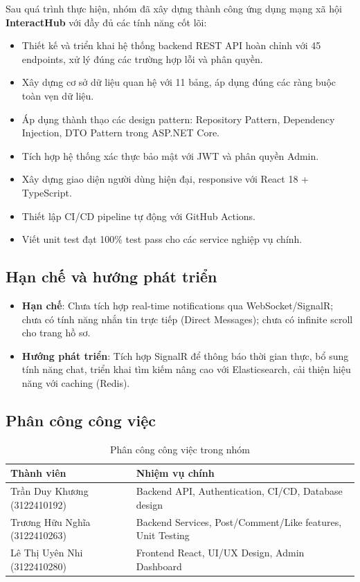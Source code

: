 \documentclass[a4paper]{article}
\begin{document}
Sau quá trình thực hiện, nhóm đã xây dựng thành công ứng dụng mạng xã hội \textbf{InteractHub} với đầy đủ các tính năng cốt lõi:

\begin{itemize}
    \item Thiết kế và triển khai hệ thống backend REST API hoàn chỉnh với 45 endpoints, xử lý đúng các trường hợp lỗi và phân quyền.
    \item Xây dựng cơ sở dữ liệu quan hệ với 11 bảng, áp dụng đúng các ràng buộc toàn vẹn dữ liệu.
    \item Áp dụng thành thạo các design pattern: Repository Pattern, Dependency Injection, DTO Pattern trong ASP.NET Core.
    \item Tích hợp hệ thống xác thực bảo mật với JWT và phân quyền Admin.
    \item Xây dựng giao diện người dùng hiện đại, responsive với React 18 + TypeScript.
    \item Thiết lập CI/CD pipeline tự động với GitHub Actions.
    \item Viết unit test đạt 100\% test pass cho các service nghiệp vụ chính.
\end{itemize}

\subsection{Hạn chế và hướng phát triển}

\begin{itemize}
    \item \textbf{Hạn chế}: Chưa tích hợp real-time notifications qua WebSocket/SignalR; chưa có tính năng nhắn tin trực tiếp (Direct Messages); chưa có infinite scroll cho trang hồ sơ.
    \item \textbf{Hướng phát triển}: Tích hợp SignalR để thông báo thời gian thực, bổ sung tính năng chat, triển khai tìm kiếm nâng cao với Elasticsearch, cải thiện hiệu năng với caching (Redis).
\end{itemize}

\subsection{Phân công công việc}

\begin{table}[h!]
\centering
\caption{Phân công công việc trong nhóm}
\begin{tabularx}{\textwidth}{|l|X|}
\hline
\textbf{Thành viên} & \textbf{Nhiệm vụ chính} \\
\hline
Trần Duy Khương (3122410192) & Backend API, Authentication, CI/CD, Database design \\
\hline
Trương Hữu Nghĩa (3122410263) & Backend Services, Post/Comment/Like features, Unit Testing \\
\hline
Lê Thị Uyên Nhi (3122410280) & Frontend React, UI/UX Design, Admin Dashboard \\
\hline
\end{tabularx}
\end{table}
\end{document}

